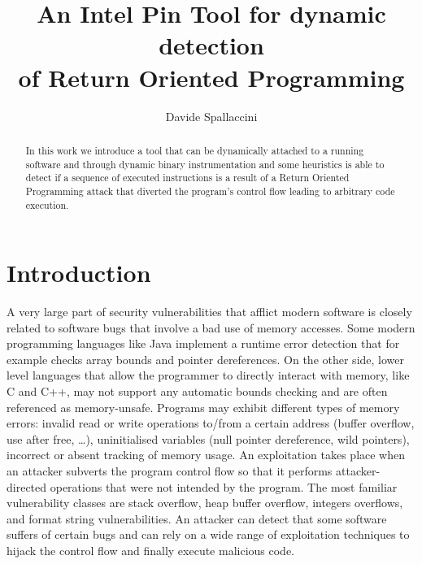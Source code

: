 \documentclass[Lau,binding=0.6cm]{sapthesis}
\title{An Intel Pin Tool for dynamic detection\\ of Return Oriented Programming}
\author{Davide Spallaccini}
\begin{document}
\frontmatter

\maketitle

\dedication{Dedicated to\\ Jon Skeet}

\begin{abstract}
In this work we introduce a tool that can be dynamically attached to a running software and through dynamic binary instrumentation and some heuristics is able to detect if a sequence of executed instructions is a result of a Return Oriented Programming attack that diverted the program’s control flow leading to arbitrary code execution.
\end{abstract}


\tableofcontents

\chapter{Introduction}
A very large part of security vulnerabilities that afflict modern software is closely related to software bugs that involve a bad use of memory accesses. Some modern programming languages like Java implement a runtime error detection that for example checks array bounds and pointer dereferences. On the other side, lower level languages that allow the programmer to directly interact with memory, like C and C++, may not support any automatic bounds checking and are often referenced as memory-unsafe.
Programs may exhibit different types of memory errors: invalid read or write operations to/from a certain address (buffer overflow, use after free, …), uninitialised variables (null pointer dereference, wild pointers), incorrect or absent tracking of memory usage. An exploitation takes place when an attacker subverts the program control flow so that it performs attacker-directed operations that were not intended by the program.
The most familiar vulnerability classes are stack overflow, heap buffer overflow, integers overflows, and format string vulnerabilities.
An attacker can detect that some software suffers of certain bugs and can rely on a wide range of exploitation techniques to hijack the control flow and finally execute malicious code.
\end{document}
